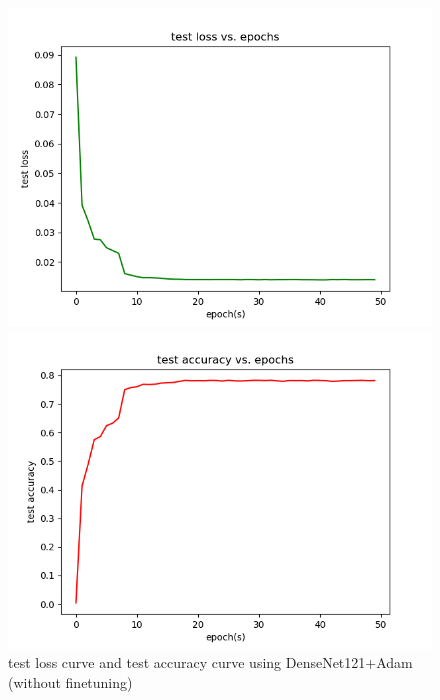 \documentclass[cn]{elegantbook}
\begin{document}
\begin{figure}[!h]
	\centering
	\begin{minipage}[t]{0.48\textwidth}
		\centering
		\includegraphics[width=\textwidth]{../results/testloss_den_adam}
	\end{minipage}
	\begin{minipage}[t]{0.48\textwidth}
		\centering
		\includegraphics[width=\textwidth]{../results/testacc_den_adam}
	\end{minipage}
	\caption{\label{testres_den_adam}test loss curve and test accuracy curve using DenseNet121+Adam (without finetuning)}
\end{figure}
\end{document}
